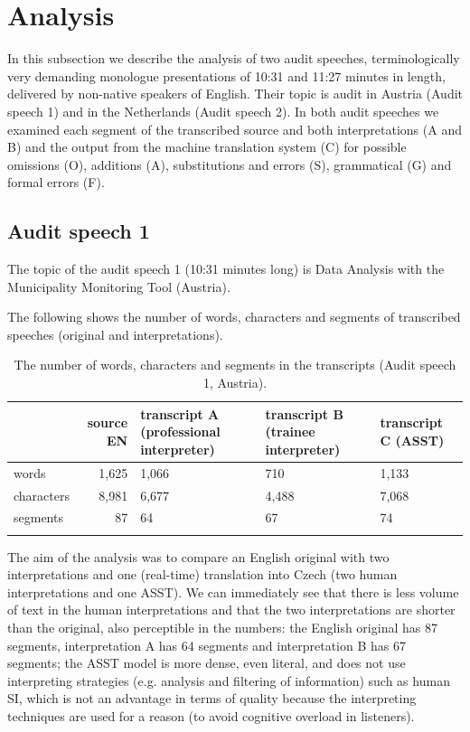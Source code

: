 \documentclass[output=paper]{langscibook}
\begin{document}
\section{Analysis}\label{sec:kloudova:4}

In this subsection we describe the analysis of two audit speeches, terminologically very demanding monologue presentations of 10:31 and 11:27 minutes in length, delivered by non-native speakers of English. Their topic is audit in Austria (Audit speech 1) and in the Netherlands (Audit speech 2). In both audit speeches we examined each segment of the transcribed source and both interpretations (A and B) and the output from the machine translation system (C) for possible omissions (O), additions (A), substitutions and errors (S), grammatical (G) and formal errors (F).

\subsection{Audit speech 1}\label{sec:kloudova:4.1}

The topic of the audit speech 1 (10:31 minutes long) is Data Analysis with the Municipality Monitoring Tool (Austria).

The following  shows the number of words, characters and segments of transcribed speeches (original and interpretations).

\begin{table}
\begin{tabularx}{\textwidth}{lrYYY}
\lsptoprule
 & source EN & transcript A (professional interpreter) & transcript B (trainee interpreter) & transcript C (ASST)\\
\midrule
words & 1,625 & 1,066 & 710 & 1,133\\
characters & 8,981 & 6,677 & 4,488 & 7,068\\
segments & 87 & 64 & 67 & 74\\
\lspbottomrule
\end{tabularx}
\caption{The number of words, characters and segments in the transcripts (Audit speech 1, Austria).}
\label{tab:kloudova:3}
\end{table}

The aim of the analysis was to compare an English original with two interpretations and one (real-time) translation into Czech (two human interpretations and one ASST). We can immediately see that there is less volume of text in the human interpretations and that the two interpretations are shorter than the original, also perceptible in the numbers: the English original has 87 segments, interpretation A has 64 segments and interpretation B has 67 segments; the ASST model is more dense, even literal, and does not use interpreting strategies (e.g. analysis and filtering of information) such as human SI, which is not an advantage in terms of quality because the interpreting techniques are used for a reason (to avoid cognitive overload in listeners).
\end{document}
